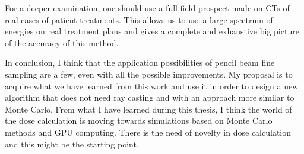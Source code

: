 \documentclass[12pt, a4paper, twoside]{book}
\begin{document}
For a deeper examination, one should use a full field prospect made on CTs of real cases of patient treatments. This allows us to use a large spectrum of energies on real treatment plans and gives a complete and exhaustive big picture of the accuracy of this method.

In conclusion, I think that the application possibilities of pencil beam fine sampling are a few, even with all the possible improvements. My proposal is to acquire what we have learned from this work and use it in order to design a new algorithm that does not need ray casting and with an approach more similar to Monte Carlo. From what I have learned during this thesis, I think the world of the dose calculation is moving towards simulations based on Monte Carlo methods and GPU computing. There is the need of novelty in dose calculation and this might be the starting point.



\listoffigures
\listoftables
\end{document}
